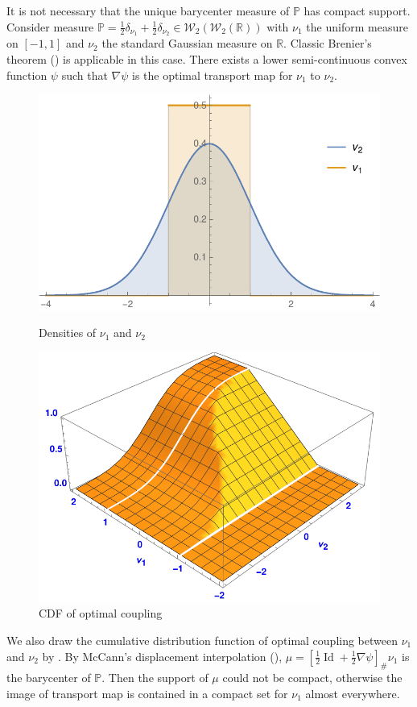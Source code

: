 \begin{rmk}
	It is not necessary that the unique barycenter measure of $\mathbb{P}$ has compact support.
	Consider measure $\mathbb{P}=
		\frac{1}{2}\delta_{\nu_1} + \frac{1}{2}\delta_{\nu_2}
		\in \mathcal{W}_2(\mathcal{W}_2(\mathbb{R}))$
	with $\nu_1$ the uniform measure on $[-1,1]$ and $\nu_2$ the standard Gaussian measure on $\mathbb{R}$.
	Classic Brenier's theorem (\cite[Theorem 2.12]{villani2003topics}) is applicable in this case.
	There exists a lower semi-continuous convex function $\psi$ such that
	$\nabla \psi$ is the optimal transport map for $\nu_1$ to $\nu_2$.
	\begin{figure}[h]
		\centering
		\begin{minipage}{.49\textwidth}
			\centering
			\includegraphics[height=.5\linewidth]{Chapters/OPT_line.pdf}
			\caption{Densities of $\nu_1$ and $\nu_2$}
		\end{minipage}
		\begin{minipage}{.49\textwidth}
			\centering
			\includegraphics[height=.5\linewidth]{Chapters/cdf_line.pdf}
			\caption{CDF of optimal coupling}
		\end{minipage}
	\end{figure}
	We also draw the cumulative distribution function
	of optimal coupling between $\nu_1$ and $\nu_2$
	by \cite[Theorem 2.18]{villani2003topics}.
	By McCann's displacement interpolation (\cite[Section 5.1.3]{villani2003topics}),
	$\mu =[\frac{1}{2} \operatorname{Id} + \frac{1}{2} \nabla \psi]_{\#} \nu_1$ is the barycenter of $\mathbb{P}$.
	Then the support of $\mu$ could not be compact,
	otherwise the image of transport map is contained
	in a compact set for $\nu_1$ almost everywhere.
\end{rmk}
